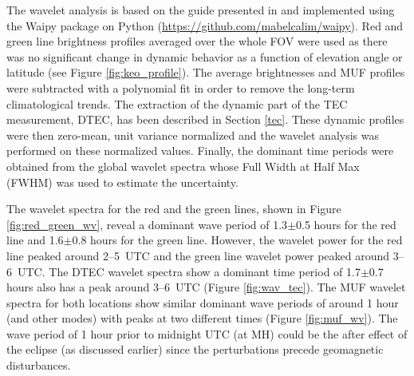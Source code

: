 \documentclass[crop=false,class=mitthesis,oneside,font=12pt]{standalone}
\begin{document}
The wavelet analysis is based on the guide presented in \citet{torrence_wavelet} and implemented using the Waipy package on Python (\url{https://github.com/mabelcalim/waipy}). Red and green line brightness profiles averaged over the whole FOV were used as there was no significant change in dynamic behavior as a function of elevation angle or latitude (see Figure \ref{fig:keo_profile}). 
The average brightnesses and MUF profiles were subtracted with a polynomial fit in order to remove the long-term climatological trends. The extraction of the dynamic part of the TEC measurement, DTEC, has been described in Section \ref{tec}. These dynamic profiles were then zero-mean, unit variance normalized and the wavelet analysis was performed on these normalized values. Finally, the dominant time periods were obtained from the global wavelet spectra whose Full Width at Half Max (FWHM) was used to estimate the uncertainty.

The wavelet spectra for the red and the green lines, shown in Figure \ref{fig:red_green_wv}, reveal a dominant wave period of 1.3$\pm$0.5 hours for the red line and 1.6$\pm$0.8 hours for the green line. However, the wavelet power for the red line peaked around 2--5~UTC and the green line wavelet power peaked around 3--6~UTC. The DTEC wavelet spectra show a dominant time period of 1.7$\pm$0.7 hours also has a peak around 3--6~UTC (Figure \ref{fig:wav_tec}). The MUF wavelet spectra for both locations show similar dominant wave periods of around 1 hour (and other modes) with peaks at two different times (Figure \ref{fig:muf_wv}). The wave period of 1 hour prior to midnight UTC (at MH) could be the after effect of the eclipse (as discussed earlier) since the perturbations precede geomagnetic disturbances.  
\end{document}
